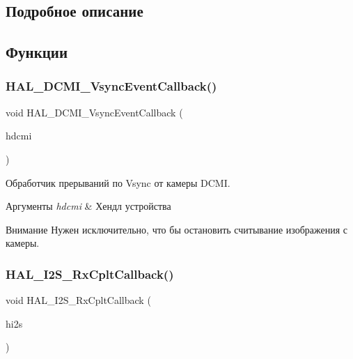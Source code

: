 \subsection{Подробное описание}


\subsection{Функции}
\mbox{\label{group___callback_ga7175c4e8555aa828b9c92cb813c3416a}} 
\subsubsection{\texorpdfstring{H\+A\+L\+\_\+\+D\+C\+M\+I\+\_\+\+Vsync\+Event\+Callback()}{HAL\_DCMI\_VsyncEventCallback()}}
{\footnotesize\ttfamily void H\+A\+L\+\_\+\+D\+C\+M\+I\+\_\+\+Vsync\+Event\+Callback (\begin{DoxyParamCaption}\item[{D\+C\+M\+I\+\_\+\+Handle\+Type\+Def $\ast$}]{hdcmi }\end{DoxyParamCaption})}



Обработчик прерываний по Vsync от камеры D\+C\+MI. 



 
\begin{DoxyParams}{Аргументы}
{\em hdcmi} & Хендл устройства \\
\hline
\end{DoxyParams}
\begin{DoxyAttention}{Внимание}
Нужен исключительно, что бы остановить считывание изображения с камеры. 
\end{DoxyAttention}
\mbox{\label{group___callback_ga18c33b2d429b06674ec30e5b2b81862c}} 
\subsubsection{\texorpdfstring{H\+A\+L\+\_\+\+I2\+S\+\_\+\+Rx\+Cplt\+Callback()}{HAL\_I2S\_RxCpltCallback()}}
{\footnotesize\ttfamily void H\+A\+L\+\_\+\+I2\+S\+\_\+\+Rx\+Cplt\+Callback (\begin{DoxyParamCaption}\item[{I2\+S\+\_\+\+Handle\+Type\+Def $\ast$}]{hi2s }\end{DoxyParamCaption})}



